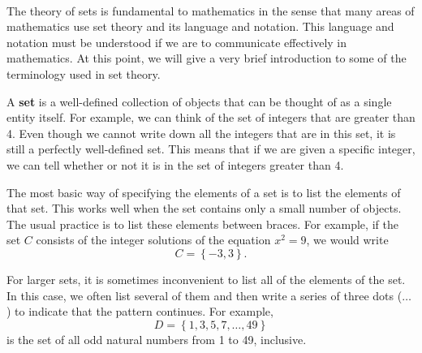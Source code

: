 \begin{previewactivity}\label{PA:sets} \hfill \\
The theory of sets is fundamental to mathematics in the sense that many areas of mathematics use set theory and its language and notation.  This language and notation must be understood if we are to communicate effectively in mathematics.  At this point, we will give a very brief introduction to some of the terminology used in set theory.  

A \textbf{set} is a well-defined collection of objects that can be thought of as a single entity itself.  For example, we can think of the set of integers that are greater than 4.  Even though we cannot write down all the integers that are in this set, it is still a perfectly well-defined set.  This means that if we are given a specific integer, we can tell whether or not it is in the set of integers greater than 4.  %



The most basic way of specifying the elements of a set is to list the elements of that set.  This works well when the set contains only a small number of objects.  The usual practice is to list these elements between braces.  For example, if the set  $C$  consists of the integer solutions of the equation  $x^2  = 9$, we would write
\[
C = \left\{ { - 3,3} \right\}.
\]

For larger sets, it is sometimes inconvenient to list all of the elements of the set.  In this case, we often list several of them and then write a series of three dots ($ \ldots $) to indicate that the pattern continues.  For example,
\[
D = \left\{ 1, 3, 5, 7, \ldots, 49 \right\}
\]
is the set of all odd natural numbers from 1 to 49, inclusive.



\end{previewactivity}
